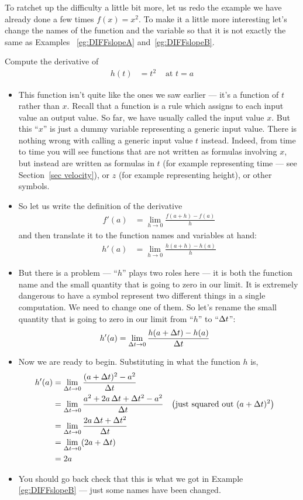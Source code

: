 To ratchet up the difficulty a little bit more, let us redo the example we have already
done a few times $f(x)=x^2$. To make it a little more interesting let's change the names
of the function and the variable so that it is not exactly the same as Examples~
\ref{eg:DIFFslopeA} and~\ref{eg:DIFFslopeB}.
\begin{eg}[Derivative of $h(t)=t^2$]\label{eg:DIFFderivX2}
Compute the derivative of
\begin{align*}
  h(t) &= t^2 & \text{ at $t=a$}
\end{align*}

\begin{itemize}
 \item This function isn't quite like the ones we saw earlier ---  it's
a function of $t$ rather than $x$. Recall that a function is a rule
which assigns to each input value an output value. So far, we have
usually called the input value $x$. But this ``$x$'' is just a dummy variable
representing a generic input value. There is nothing wrong with calling
a generic input value $t$ instead. Indeed, from time to time you will
see functions that are not written as formulas involving $x$, but instead
are written as formulas in  $t$ (for example representing
time --- see Section~\ref{sec velocity}), or $z$ (for example
representing height), or other symbols.

\item So let us write the definition of the derivative
\begin{align*}
  f'(a) &= \lim_{h \to 0} \frac{f(a+h)-f(a)}{h}
\end{align*}
and then translate it to the function names and variables at hand:
\begin{align*}
  h'(a) &= \lim_{h \to 0} \frac{h(a+h)-h(a)}{h}
\end{align*}
\item But there is a problem --- ``$h$'' plays two roles here --- it is both
the function name and the small quantity that is going to zero in our limit.
It is extremely dangerous to have a symbol represent two different things
in a single computation. We need to change one of them. So let's rename
the small quantity that is going to zero in our limit from ``$h$'' to
``$\Delta t$'':
\begin{align*}
  h'(a) &= \lim_{\Delta t \to 0} \frac{h(a+\Delta t)-h(a)}{\Delta t}
\end{align*}
\item Now we are ready to begin. Substituting in what the function $h$ is,
\begin{align*}
 h'(a) &= \lim_{\Delta t \to 0} \frac{(a+\Delta t)^2-a^2}{\Delta t}  \\
  &= \lim_{\Delta t \to 0} \frac{a^2+2a\,\Delta t+\Delta t^2-a^2}{\Delta t}
           && \big(\text{just squared out $(a+\Delta t)^2$}\big) \\
  &= \lim_{\Delta t \to 0} \frac{2a\,\Delta t+\Delta t^2}{\Delta t}  \\
  &= \lim_{\Delta t \to 0} (2a +\Delta t)  \\
  &= 2a
\end{align*}
\item You should go back check that this is what we got in Example
\ref{eg:DIFFslopeB} --- just some names have been changed.


\end{itemize}
\end{eg}
